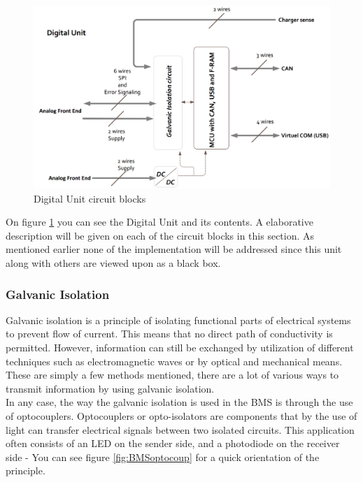 \begin{figure}[H]
	\centering
	\includegraphics[width=1.0\linewidth]{Hardware/Pictures/BMSdigitalUnit}
	\caption[Empty]{Digital Unit circuit blocks\footnotemark}
	\label{fig:BMSdigitalUnit}
\end{figure}

On figure \ref{fig:BMSdigitalUnit} you can see the Digital Unit and its contents. A elaborative description will be given on each of the circuit blocks in this section. As mentioned earlier none of the implementation will be addressed since this unit along with others are viewed upon as a black box.

\subsubsection{Galvanic Isolation}
Galvanic isolation is a principle of isolating functional parts of electrical systems to prevent flow of current. This means that no direct path of conductivity is permitted. However, information can still be exchanged by utilization of different techniques such as electromagnetic waves or by optical and mechanical means. These are simply a few methods mentioned, there are a lot of various ways to transmit information by using galvanic isolation.\\
In any case, the way the galvanic isolation is used in the BMS is through the use of optocouplers. Optocouplers or opto-isolators are components that by the use of light can transfer electrical signals between two isolated circuits. This application often consists of an LED on the sender side, and a photodiode on the receiver side - You can see figure \ref{fig:BMSoptocoup} for a quick orientation of the principle.

